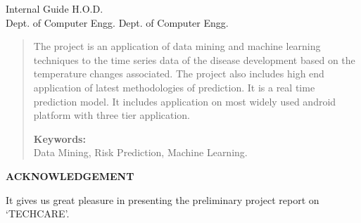 \documentclass[12pt,a4paper]{report}
\begin{document}
\begin{center}
\begin{center}
	Internal Guide \hspace{0.6 in}\hspace{0.6 in}\hspace{0.6 in} \hspace{0.6 in} \hspace{0.6 in}\hspace{0.6 in} H.O.D.\\
	Dept. of Computer Engg. \hspace{0.7 in} \hspace{0.7 in} \hspace{0.6 in} Dept. of Computer Engg.\\
\end{center}
\singlespace

	\end{center}


\begin{abstract}
	
	\begin{normalsize}
		
		\hspace{6mm} The project is an application of data mining and machine learning techniques to the time series data of the disease development based on the temperature changes associated. The project also includes high end application of latest methodologies of prediction. It is a real time prediction model. It includes application on most widely used android platform with three tier application.
		
		\textbf{Keywords:}\\ 
		Data Mining, Risk Prediction, Machine Learning.
		
	\end{normalsize}
\end{abstract}
\newpage
\pagestyle{plain}           %
\begin{center}
\bf ACKNOWLEDGEMENT
\end{center}
\hspace*{0.6cm}It gives us great pleasure in presenting the preliminary project report on `TECHCARE'.\\
\end{document}
